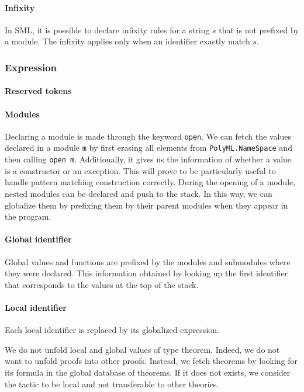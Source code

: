 \documentclass[runningheads,a4paper,draft]{svjour3}
\def\sml{\textsf{SML}\xspace}
\begin{document}
\paragraph{Infixity}                                                            
In \sml, it is possible to declare infixity rules for a string $s$ that 
is not prefixed by a module. The infixity applies only when an identifier 
exactly match $s$.                
                                                                                
\subsubsection{Expression}

\paragraph{Reserved tokens}

\paragraph{Modules}
Declaring a module is made through the keyword 
\texttt{open}. We can fetch 
the values declared in a module \texttt{m} by first erasing all elements from 
\texttt{PolyML.NameSpace} and then calling \texttt{open m}. Additionally, it 
gives us the information of whether a value is a constructor or an exception. 
This will prove to be particularly useful to handle pattern matching 
construction correctly. During the opening of a module, nested modules can be 
declared and push to the stack. In this way, we can globalize them by prefixing 
them by their parent modules when they appear in the program.

\paragraph{Global identifier}
Global values and functions are prefixed by the modules and submodules where 
they were declared. This information obtained by looking up the first 
identifier that corresponds to the values at the top of the stack.

\paragraph{Local identifier}
Each local identifier is replaced by its globalized expression.

We do not unfold local and global values of type theorem. Indeed, we do not 
want to 
unfold proofs into other proofs. Instead, we fetch theorems by looking for its 
formula in the global database of 
theorems. If it does not exists, we consider the tactic to be local and not 
transferable to other theories.
\end{document}

